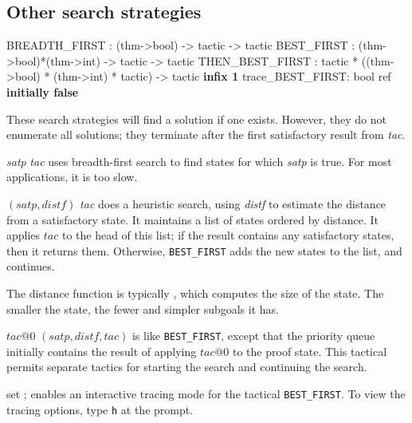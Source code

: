\subsection{Other search strategies}
\begin{ttbox} 
BREADTH_FIRST   :            (thm->bool) -> tactic -> tactic
BEST_FIRST      : (thm->bool)*(thm->int) -> tactic -> tactic
THEN_BEST_FIRST : tactic * ((thm->bool) * (thm->int) * tactic)
                  -> tactic                    \hfill{\bf infix 1}
trace_BEST_FIRST: bool ref \hfill{\bf initially false}
\end{ttbox}
These search strategies will find a solution if one exists.  However, they
do not enumerate all solutions; they terminate after the first satisfactory
result from {\it tac}.
\begin{ttdescription}
\item[\ttindexbold{BREADTH_FIRST} {\it satp} {\it tac}] 
uses breadth-first search to find states for which {\it satp\/} is true.
For most applications, it is too slow.

\item[\ttindexbold{BEST_FIRST} $(satp,distf)$ {\it tac}] 
does a heuristic search, using {\it distf\/} to estimate the distance from
a satisfactory state.  It maintains a list of states ordered by distance.
It applies $tac$ to the head of this list; if the result contains any
satisfactory states, then it returns them.  Otherwise, {\tt BEST_FIRST}
adds the new states to the list, and continues.  

The distance function is typically , which computes
the size of the state.  The smaller the state, the fewer and simpler
subgoals it has.

\item[$tac@0$ \ttindexbold{THEN_BEST_FIRST} $(satp,distf,tac)$] 
is like {\tt BEST_FIRST}, except that the priority queue initially
contains the result of applying $tac@0$ to the proof state.  This tactical
permits separate tactics for starting the search and continuing the search.

\item[set \ttindexbold{trace_BEST_FIRST};] 
enables an interactive tracing mode for the tactical {\tt BEST_FIRST}.  To
view the tracing options, type {\tt h} at the prompt.
\end{ttdescription}


